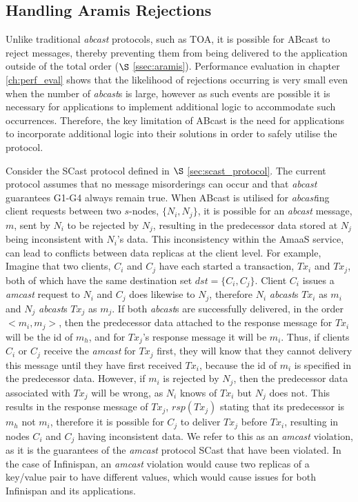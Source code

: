 \subsection*{Handling Aramis Rejections}
 Unlike traditional \emph{abcast} protocols, such as TOA, it is possible for \textsf{ABcast} to reject messages, thereby preventing them from being delivered to the application outside of the total order ($\S$ \ref{ssec:aramis}).  Performance evaluation in chapter \ref{ch:perf_eval} shows that the likelihood of rejections occurring is very small even when the number of \emph{abcast}s is large, however as such events are possible it is necessary for applications to implement additional logic to accommodate such occurrences.  Therefore, the key limitation of \textsf{ABcast} is the need for applications to incorporate additional logic into their solutions in order to safely utilise the protocol.   
 
Consider the \textsf{SCast} protocol defined in $\S$ \ref{sec:scast_protocol}.  The current protocol assumes that no message misorderings can occur and that \emph{abcast} guarantees G1-G4 always remain true.  When \textsf{ABcast} is utilised for \emph{abcast}ing client requests between two $s$-nodes, $\{N_i, N_j\}$, it is possible for an \emph{abcast} message, $m$, sent by $N_i$ to be rejected by $N_j$, resulting in the predecessor data stored at $N_j$ being inconsistent with $N_i$'s data.  This inconsistency within the \textsf{AmaaS} service, can lead to conflicts between data replicas at the client level.  For example, Imagine that two clients, $C_i$ and $C_j$ have each started a transaction, $Tx_i$ and $Tx_j$, both of which have the same destination set $dst=\{C_i, C_j\}$.  Client $C_i$ issues a \emph{amcast} request to $N_i$ and $C_j$ does likewise to $N_j$, therefore $N_i$ \emph{abcast}s $Tx_i$ as $m_i$ and $N_j$ \emph{abcast}s $Tx_j$ as $m_j$.  If both \emph{abcast}s are successfully delivered, in the order $<m_i, m_j>$, then the predecessor data attached to the response message for $Tx_i$ will be the id of $m_h$, and for $Tx_j$'s response message it will be $m_i$.  Thus, if clients $C_i$ or $C_j$ receive the \emph{amcast} for $Tx_j$ first, they will know that they cannot delivery this message until they have first received $Tx_i$, because the id of $m_i$ is specified in the predecessor data.  However, if $m_i$ is rejected by $N_j$, then the predecessor data associated with $Tx_j$ will be wrong, as $N_i$ knows of $Tx_i$ but $N_j$ does not.  This results in the response message of $Tx_j$, $rsp(Tx_j)$ stating that its predecessor is $m_h$ not $m_i$, therefore it is possible for $C_j$ to deliver $Tx_j$ before $Tx_i$, resulting in nodes $C_i$ and $C_j$ having inconsistent data.  We refer to this as an \emph{amcast} violation, as it is the guarantees of the \emph{amcast} protocol \textsf{SCast} that have been violated.  In the case of Infinispan, an \emph{amcast} violation would cause two replicas of a key/value pair to have different values, which would cause issues for both Infinispan and its applications.  

